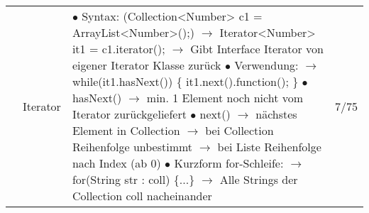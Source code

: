 \documentclass[11pt,a4paper]{article}
\begin{document}
\begin{center}
\begin{longtable}[h]{ | p{2.3cm} | p{2.3cm} | p{12.6cm} | p{1.2cm} | }
	& Iterator & \makecell[l]{$\bullet$ Syntax:  (Collection<Number> c1 = ArrayList<Number>();) \\
	\hspace{0.4cm} $\rightarrow$ Iterator<Number> it1 = c1.iterator(); \\
	\hspace{0.4cm} $\rightarrow$ Gibt Interface Iterator von eigener Iterator Klasse zurück \\ 
	$\bullet$ Verwendung: \\
	\hspace{0.4cm} $\rightarrow$ while(it1.hasNext()) \{   \\
	\hspace{1cm} it1.next().function(); \} \\
	\hspace{0.4cm} $\bullet$ hasNext() \\
	\hspace{0.6cm} $\rightarrow$ min. 1 Element noch nicht vom Iterator zurückgeliefert \\
	\hspace{0.4cm} $\bullet$ next() \\
	\hspace{0.6cm} $\rightarrow$ nächstes Element in Collection \\
	\hspace{0.6cm} $\rightarrow$ bei Collection Reihenfolge unbestimmt \\
	\hspace{0.6cm} $\rightarrow$ bei Liste Reihenfolge nach Index (ab 0) \\
	$\bullet$ Kurzform for-Schleife: \\
	\hspace{0.4cm} $\rightarrow$ for(String str : coll) \{...\} \\
	\hspace{0.6cm} $\rightarrow$ Alle Strings der Collection coll nacheinander}  & 7/75 \\ \cline{2-4}
	

\end{longtable}
\end{center}
\end{document}

